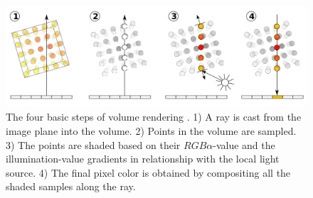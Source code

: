 \begin{figure}[h]
    \centering
    \includegraphics[width=1.0\textwidth]{figures/volume-rendering.png}
    \caption[The four basic steps of volume rendering]{The four basic steps of volume rendering \cite{wiki:Volume_ray_casting}. 1) A ray is cast from the image plane into the volume. 2) Points in the volume are sampled. 3) The points are shaded based on their $RGB\alpha$-value and the illumination-value gradients in relationship with the local light source. 4) The final pixel color is obtained by compositing all the shaded samples along the ray.}
    \label{fig:volume-rendering}
\end{figure}